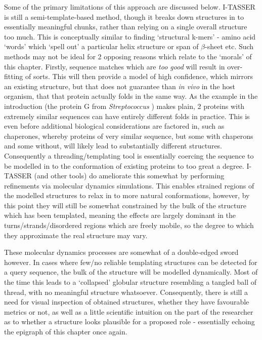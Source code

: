 Some of the primary limitations of this approach are discussed below. I-TASSER is still a semi-template-based method, though it breaks down structures in to essentially meaningful chunks, rather than relying on a single overall structure too much. This is conceptually similar to finding `structural k-mers' - amino acid `words' which `spell out' a particular helix structure or span of $\beta$-sheet etc. Such methods may not be ideal for 2 opposing reasons which relate to the `morals' of this chapter. Firstly, sequence matches which are \emph{too good} will result in over-fitting of sorts. This will then provide a model of high confidence, which mirrors an existing structure, but that does not guarantee than \emph{in vivo} in the host organism, that that protein actually folds in the same way. As the example in the introduction (the protein G from \emph{Streptococcus} \citep{Alexander2007}) makes plain, 2 proteins with extremely similar sequences can have entirely different folds in practice. This is even before additional biological considerations are factored in, such as chaperones, whereby proteins of very similar sequence, but some with chaperons and some without, will likely lead to substantially different structures. Consequently a threading/templating tool is essentially coercing the sequence to be modelled in to the conformation of existing proteins to too great a degree. I-TASSER (and other tools) do ameliorate this somewhat by performing refinements via molecular dynamics simulations. This enables strained regions of the modelled structures to relax in to more natural conformations, however, by this point they will still be somewhat constrained by the bulk of the structure which has been templated, meaning the effects are largely dominant in the turns/strands/disordered regions which are freely mobile, so the degree to which they approximate the real structure may vary.

These molecular dynamics processes are somewhat of a double-edged sword however. In cases where few/no reliable templating structures can be detected for a query sequence, the bulk of the structure will be modelled dynamically. Most of the time this leads to a `collapsed' globular structure resembling a tangled ball of thread, with no meaningful structure whatsoever. Consequently, there is still a need for visual inspection of obtained structures, whether they have favourable metrics or not, as well as a little scientific intuition on the part of the researcher as to whether a structure looks plausible for a proposed role - essentially echoing the epigraph of this chapter once again.

